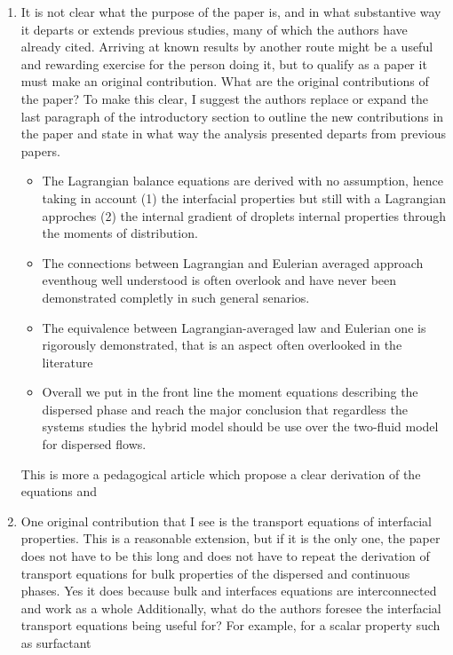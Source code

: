 \documentclass[10pt,a4paper]{article}
\newcommand{\tb}[1]{\color{blue}#1\color{black}}
\newcommand{\tr}[1]{\color{red}#1\color{black}}
\begin{document}
\begin{enumerate}
    \item It is not clear what the purpose of the paper is, and in what substantive way it departs or
    extends previous studies, many of which the authors have already cited. Arriving at known
    results by another route might be a useful and rewarding exercise for the person doing it, but
    to qualify as a paper it must make an original contribution. What are the original
    contributions of the paper? To make this clear, I suggest the authors replace or expand the
    last paragraph of the introductory section to outline the new contributions in the paper and
    state in what way the analysis presented departs from previous papers.
    \tb{
        \begin{itemize}
            \item The Lagrangian balance equations are derived with no assumption, hence taking in account (1) the interfacial properties but still with a Lagrangian approches (2) the internal gradient of droplets internal properties through the moments of distribution. 
            \item The connections between Lagrangian and Eulerian averaged approach eventhoug well understood is often overlook and have never been demonstrated completly in such general senarios. 
            \item The equivalence between Lagrangian-averaged law and Eulerian one is rigorously demonstrated, that is an aspect often overlooked in the literature 
            \item Overall we put in the front line the moment equations describing the dispersed phase and reach the major conclusion that regardless the systems studies the hybrid model should be use over the two-fluid model for dispersed flows. 
        \end{itemize}
        \tr{This is more a pedagogical article which propose a clear derivation of the equations and }
    }
    \item One original contribution that I see is the transport equations of interfacial properties. This
    is a reasonable extension, but if it is the only one, the paper does not have to be this long and
    does not have to repeat the derivation of transport equations for bulk properties of the
    dispersed and continuous phases. 
    \tb{Yes it does because bulk and interfaces equations are  interconnected and work as a whole}
    Additionally, what do the authors foresee the interfacial
    transport equations being useful for? For example, for a scalar property such as surfactant

\end{enumerate}
\end{document}
